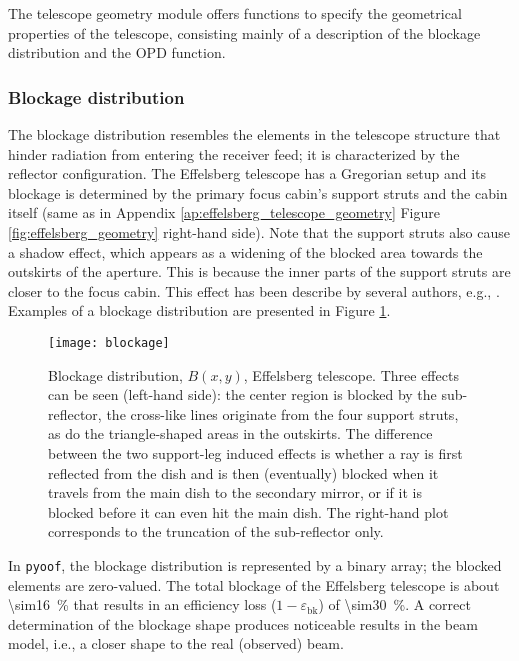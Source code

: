 \documentclass[
    ]
    {aa}
\begin{document}
    The telescope geometry module offers functions to specify the geometrical properties of the telescope, consisting mainly of a description of the blockage distribution and the OPD function.

    \subsubsection{Blockage distribution}

    The blockage distribution resembles the elements in the telescope structure that hinder radiation from entering the receiver feed; it is characterized by the reflector configuration. The Effelsberg telescope has a Gregorian setup and its blockage is determined by the primary focus cabin's support struts and the cabin itself (same as in Appendix \ref{ap:effelsberg_telescope_geometry} Figure \ref{fig:effelsberg_geometry} right-hand side). Note that the support struts also cause a shadow effect, which appears as a widening of the blocked area towards the outskirts of the aperture. This is because the inner parts of the support struts are closer to the focus cabin. This effect has been describe by several authors, e.g., \citet{1996A&AS..119..115H,kesteveen2001effelsberg}. Examples of a blockage distribution are presented in Figure \ref{fig:blockage}.
    \begin{figure}
        \centering
        \texttt{[image: blockage]}
        \caption{Blockage distribution, $B(x, y)$, Effelsberg telescope. Three effects can be seen (left-hand side): the center region is blocked by the sub-reflector, the cross-like lines originate from the four support struts, as do the triangle-shaped areas in the outskirts. The difference between the two support-leg induced effects is whether a ray is first reflected from the dish and is then (eventually) blocked when it travels from the main dish to the secondary mirror, or if it is blocked before it can even hit the main dish. The right-hand plot corresponds to the truncation of the sub-reflector only.}
        \label{fig:blockage}
    \end{figure}
    In \texttt{pyoof}, the blockage distribution is represented by a binary array; the blocked elements are zero-valued. The total blockage of the Effelsberg telescope is about \SI{\sim16}{\percent} that results in an efficiency loss ($1-\varepsilon_\text{bk}$) of \SI{\sim30}{\percent}. 
    A correct determination of the blockage shape produces noticeable results in the beam model, i.e., a closer shape to the real (observed) beam.
\end{document}
